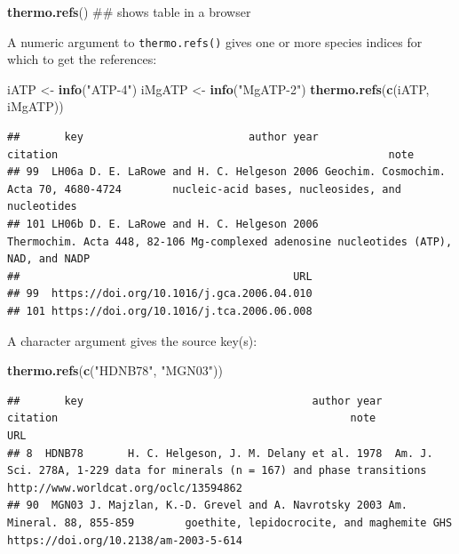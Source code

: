 \documentclass[]{tufte-handout}
\newenvironment{Shaded}{}{}
\newcommand{\KeywordTok}[1]{\textcolor[rgb]{0.00,0.44,0.13}{\textbf{#1}}}
\newcommand{\StringTok}[1]{\textcolor[rgb]{0.25,0.44,0.63}{#1}}
\newcommand{\NormalTok}[1]{#1}
\begin{document}
\begin{Shaded}
\begin{Highlighting}[]
\KeywordTok{thermo.refs}\NormalTok{()  ## shows table in a browser}
\end{Highlighting}
\end{Shaded}

A numeric argument to {\texttt{thermo.refs()}} gives one or more species
indices for which to get the references:

\begin{Shaded}
\begin{Highlighting}[]
\NormalTok{iATP <-}\StringTok{ }\KeywordTok{info}\NormalTok{(}\StringTok{"ATP-4"}\NormalTok{)}
\NormalTok{iMgATP <-}\StringTok{ }\KeywordTok{info}\NormalTok{(}\StringTok{"MgATP-2"}\NormalTok{)}
\KeywordTok{thermo.refs}\NormalTok{(}\KeywordTok{c}\NormalTok{(iATP, iMgATP))}
\end{Highlighting}
\end{Shaded}

\begin{verbatim}
##       key                          author year                               citation                                                    note
## 99  LH06a D. E. LaRowe and H. C. Helgeson 2006 Geochim. Cosmochim. Acta 70, 4680-4724        nucleic-acid bases, nucleosides, and nucleotides
## 101 LH06b D. E. LaRowe and H. C. Helgeson 2006           Thermochim. Acta 448, 82-106 Mg-complexed adenosine nucleotides (ATP), NAD, and NADP
##                                           URL
## 99  https://doi.org/10.1016/j.gca.2006.04.010
## 101 https://doi.org/10.1016/j.tca.2006.06.008
\end{verbatim}

A character argument gives the source key(s):

\begin{Shaded}
\begin{Highlighting}[]
\KeywordTok{thermo.refs}\NormalTok{(}\KeywordTok{c}\NormalTok{(}\StringTok{"HDNB78"}\NormalTok{, }\StringTok{"MGN03"}\NormalTok{))}
\end{Highlighting}
\end{Shaded}

\begin{verbatim}
##       key                                    author year                 citation                                              note                                   URL
## 8  HDNB78       H. C. Helgeson, J. M. Delany et al. 1978  Am. J. Sci. 278A, 1-229 data for minerals (n = 167) and phase transitions http://www.worldcat.org/oclc/13594862
## 90  MGN03 J. Majzlan, K.-D. Grevel and A. Navrotsky 2003 Am. Mineral. 88, 855-859        goethite, lepidocrocite, and maghemite GHS https://doi.org/10.2138/am-2003-5-614
\end{verbatim}
\end{document}
